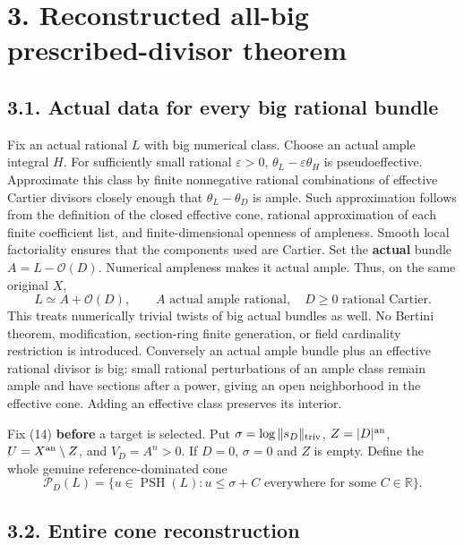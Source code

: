 \documentclass[
  10pt,
]{article}
\begin{document}
\section{3. Reconstructed all-big prescribed-divisor
theorem}\label{reconstructed-all-big-prescribed-divisor-theorem}

\subsection{3.1. Actual data for every big rational
bundle}\label{actual-data-for-every-big-rational-bundle}

Fix an actual rational \(L\) with big numerical class. Choose an actual
ample integral \(H\). For sufficiently small rational \(\varepsilon>0\),
\(\theta_L-\varepsilon\theta_H\) is pseudoeffective. Approximate this
class by finite nonnegative rational combinations of effective Cartier
divisors closely enough that \(\theta_L-\theta_D\) is ample. Such
approximation follows from the definition of the closed effective cone,
rational approximation of each finite coefficient list, and
finite-dimensional openness of ampleness. Smooth local factoriality
ensures that the components used are Cartier. Set the \textbf{actual}
bundle \(A=L-\mathcal O(D)\). Numerical ampleness makes it actual ample.
Thus, on the same original \(X\),
\[L\simeq A+\mathcal O(D),\qquad A\text{ actual ample rational},\quad D\geq0\text{ rational Cartier}.\tag{14}\]
This treats numerically trivial twists of big actual bundles as well. No
Bertini theorem, modification, section-ring finite generation, or field
cardinality restriction is introduced. Conversely an actual ample bundle
plus an effective rational divisor is big: small rational perturbations
of an ample class remain ample and have sections after a power, giving
an open neighborhood in the effective cone. Adding an effective class
preserves its interior.

Fix (14) \textbf{before} a target is selected. Put
\(\sigma=\log\|s_D\|_{\rm triv}\), \(Z=|D|^{\rm an}\),
\(U=X^{\rm an}\setminus Z\), and \(V_D=A^n>0\). If \(D=0\), \(\sigma=0\)
and \(Z\) is empty. Define the whole genuine reference-dominated cone
\[\mathcal P_D(L)=\{u\in\operatorname{PSH}(L):u\leq\sigma+C\text{ everywhere for some }C\in\mathbb R\}.\tag{15}\]

\subsection{3.2. Entire cone
reconstruction}\label{entire-cone-reconstruction}
\end{document}
